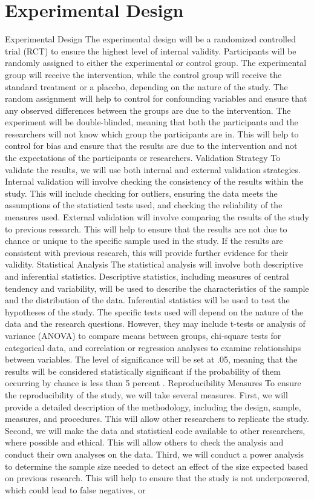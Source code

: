 \documentclass[conference]{IEEEtran}
\begin{document}
\section{Experimental Design}
Experimental Design The experimental design will be a randomized controlled trial (RCT) to ensure the highest level of internal validity. Participants will be randomly assigned to either the experimental or control group. The experimental group will receive the intervention, while the control group will receive the standard treatment or a placebo, depending on the nature of the study. The random assignment will help to control for confounding variables and ensure that any observed differences between the groups are due to the intervention. The experiment will be double-blinded, meaning that both the participants and the researchers will not know which group the participants are in. This will help to control for bias and ensure that the results are due to the intervention and not the expectations of the participants or researchers. Validation Strategy To validate the results, we will use both internal and external validation strategies. Internal validation will involve checking the consistency of the results within the study. This will include checking for outliers, ensuring the data meets the assumptions of the statistical tests used, and checking the reliability of the measures used. External validation will involve comparing the results of the study to previous research. This will help to ensure that the results are not due to chance or unique to the specific sample used in the study. If the results are consistent with previous research, this will provide further evidence for their validity. Statistical Analysis The statistical analysis will involve both descriptive and inferential statistics. Descriptive statistics, including measures of central tendency and variability, will be used to describe the characteristics of the sample and the distribution of the data. Inferential statistics will be used to test the hypotheses of the study. The specific tests used will depend on the nature of the data and the research questions. However, they may include t-tests or analysis of variance (ANOVA) to compare means between groups, chi-square tests for categorical data, and correlation or regression analyses to examine relationships between variables. The level of significance will be set at .05, meaning that the results will be considered statistically significant if the probability of them occurring by chance is less than 5 percent . Reproducibility Measures To ensure the reproducibility of the study, we will take several measures. First, we will provide a detailed description of the methodology, including the design, sample, measures, and procedures. This will allow other researchers to replicate the study. Second, we will make the data and statistical code available to other researchers, where possible and ethical. This will allow others to check the analysis and conduct their own analyses on the data. Third, we will conduct a power analysis to determine the sample size needed to detect an effect of the size expected based on previous research. This will help to ensure that the study is not underpowered, which could lead to false negatives, or 
\end{document}

